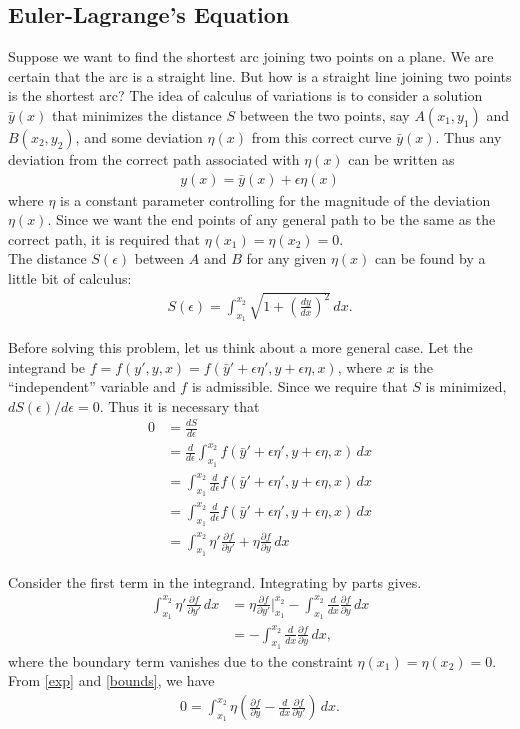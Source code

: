 \documentclass{article}
\newcommand{\p}{\partial}
\newcommand{\f}[2]{\frac{#1}{#2}}
\newcommand{\lp}{\left(}
\newcommand{\rp}{\right)}
\begin{document}
\subsection{Euler-Lagrange's Equation}

Suppose we want to find the shortest arc joining two points on a plane. We are certain that the arc is a straight line. But how is a straight line joining two points is the shortest arc? The idea of calculus of variations is to consider a solution $\bar{y}(x)$ that minimizes the distance $S$ between the two points, say $A(x_1,y_1)$ and $B(x_2,y_2)$, and some deviation $\eta(x)$ from this correct curve $\bar{y}(x)$. Thus any deviation from the correct path associated with $\eta(x)$ can be written as
\begin{align}
y(x) = \bar{y}(x) + \epsilon \eta(x)
\end{align}
where $\eta$ is a constant parameter controlling for the magnitude of the deviation $\eta(x)$. Since we want the end points of any general path to be the same as the correct path, it is required that $\eta(x_1) = \eta(x_2) = 0$.\\

The distance $S(\epsilon)$ between $A$ and $B$ for any given $\eta(x)$ can be found by a little bit of calculus:
\begin{align}
S(\epsilon) = \int^{x_2}_{x_1}\sqrt{1 + \left(\frac{dy}{dx}\right)^2}\,dx.
\end{align}

Before solving this problem, let us think about a more general case. Let the integrand be $f = f(y',y,x) = f(\bar{y}'+\epsilon\eta',y+\epsilon\eta,x)$, where $x$ is the ``independent'' variable and $f$ is admissible. Since we require that $S$ is minimized, $dS(\epsilon)/d\epsilon = 0$. Thus it is necessary that
\begin{align}\label{exp}
0 &= \f{dS}{d\epsilon} \nonumber\\ 
&= \f{d}{d\epsilon}\int^{x_2}_{x_1}f(\bar{y}'+\epsilon\eta',y+\epsilon\eta,x)\,dx \nonumber\\
&= \int^{x_2}_{x_1}\f{d}{d\epsilon}f(\bar{y}'+\epsilon\eta',y+\epsilon\eta,x)\,dx \nonumber\\
&= \int^{x_2}_{x_1}\f{d}{d\epsilon}f(\bar{y}'+\epsilon\eta',y+\epsilon\eta,x)\,dx \nonumber\\
&= \int^{x_2}_{x_1}\eta'\f{\p f}{\p y'} + \eta\f{\p f}{\p y}\,dx 
\end{align}

Consider the first term in the integrand. Integrating by parts gives.
\begin{align}\label{bounds}
\int^{x_2}_{x_1}\eta'\f{\p f}{\p y'} \,dx
&= \eta\f{\p f}{\p y'}\bigg\vert_{x_1}^{x_2} -  \int^{x_2}_{x_1}  \f{d}{dx}\f{\p f}{\p y} \,dx \nonumber\\
&= -  \int^{x_2}_{x_1}  \f{d}{dx}\f{\p f}{\p y} \,dx,
\end{align} 
where the boundary term vanishes due to the constraint $\eta(x_1) = \eta(x_2) = 0$. From \eqref{exp} and \eqref{bounds}, we have
\begin{align}
0 = \int^{x_2}_{x_1} \eta\lp \f{\p f}{\p y} - \f{d}{dx}\f{\p f}{\p y'}  \rp\,dx. 
\end{align}
\end{document}
